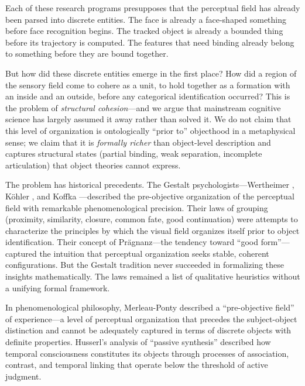 \documentclass[lettersize,journal]{IEEEtran}
\begin{document}
Each of these research programs presupposes that the perceptual field has already been parsed into discrete entities. The face is already a face-shaped something before face recognition begins. The tracked object is already a bounded thing before its trajectory is computed. The features that need binding already belong to something before they are bound together.

But how did these discrete entities emerge in the first place? How did a region of the sensory field come to cohere as a unit, to hold together as a formation with an inside and an outside, before any categorical identification occurred? This is the problem of \emph{structural cohesion}---and we argue that mainstream cognitive science has largely assumed it away rather than solved it. We do not claim that this level of organization is ontologically ``prior to'' objecthood in a metaphysical sense; we claim that it is \emph{formally richer} than object-level description and captures structural states (partial binding, weak separation, incomplete articulation) that object theories cannot express.

The problem has historical precedents. The Gestalt psychologists---Wertheimer \cite{wertheimer1923untersuchungen}, K\"{o}hler \cite{kohler1929gestalt}, and Koffka \cite{koffka1935principles}---described the pre-objective organization of the perceptual field with remarkable phenomenological precision. Their laws of grouping (proximity, similarity, closure, common fate, good continuation) were attempts to characterize the principles by which the visual field organizes itself prior to object identification. Their concept of Pr\"{a}gnanz---the tendency toward ``good form''---captured the intuition that perceptual organization seeks stable, coherent configurations. But the Gestalt tradition never succeeded in formalizing these insights mathematically. The laws remained a list of qualitative heuristics without a unifying formal framework.

In phenomenological philosophy, Merleau-Ponty \cite{merleauponty1945phenomenology} described a ``pre-objective field'' of experience---a level of perceptual organization that precedes the subject-object distinction and cannot be adequately captured in terms of discrete objects with definite properties. Husserl's \cite{husserl1966analysen} analysis of ``passive synthesis'' described how temporal consciousness constitutes its objects through processes of association, contrast, and temporal linking that operate below the threshold of active judgment.
\end{document}

